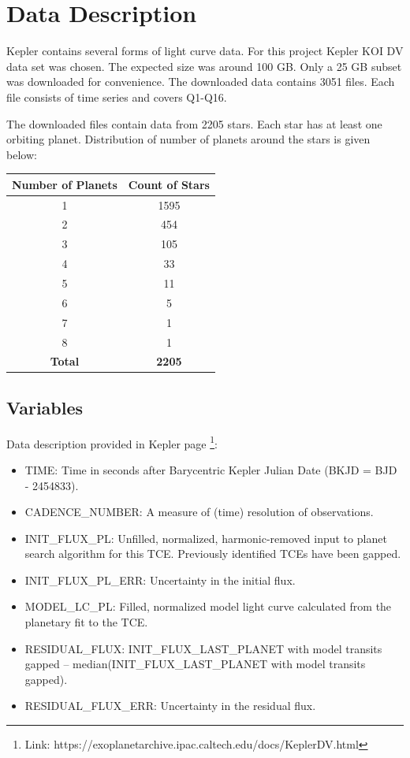 \documentclass[%
aip,
amsmath,amssymb,
reprint,%
]{revtex4-1}
\begin{document}
\section{Data Description}

Kepler contains several forms of light curve data. For this project Kepler KOI DV data set was chosen. The expected size was around 100 GB. Only a 25 GB subset was downloaded for convenience. The downloaded data contains 3051 files. Each file consists of time series and covers Q1-Q16.

The downloaded files contain data from 2205 stars. Each star has at least one orbiting planet. Distribution of number of planets around the stars is given below:

\begin{center}
 \begin{tabular}{| c | c |} 
 \hline
 \textbf{Number of Planets} & \textbf{Count of Stars}\\ [0.5 ex]
 \hline
 1 & 1595 \\ 
 \hline
 2 & 454 \\
 \hline
 3 & 105 \\
 \hline
 4 & 33 \\
 \hline
 5 & 11 \\
 \hline
 6 & 5 \\
 \hline
 7 & 1 \\
 \hline
 8 & 1 \\
 \hline
 \textbf{Total} & \textbf{2205} \\ [1ex] 
 \hline
\end{tabular}
\end{center}


\subsection{Variables}

Data description provided in Kepler page \footnote{Link: https://exoplanetarchive.ipac.caltech.edu/docs/KeplerDV.html}:

\begin{itemize}
  \item TIME: Time in seconds after Barycentric Kepler Julian Date (BKJD = BJD - 2454833).
  \item CADENCE\_NUMBER: A measure of (time) resolution of observations.
  \item INIT\_FLUX\_PL: Unfilled, normalized, harmonic-removed input to planet search algorithm for this TCE. Previously identified TCEs have been gapped.
  \item INIT\_FLUX\_PL\_ERR: Uncertainty in the initial flux.
  \item MODEL\_LC\_PL: Filled, normalized model light curve calculated from the planetary fit to the TCE.
  \item RESIDUAL\_FLUX: INIT\_FLUX\_LAST\_PLANET with model transits gapped – median(INIT\_FLUX\_LAST\_PLANET with model transits gapped).
  \item RESIDUAL\_FLUX\_ERR: Uncertainty in the residual flux.
\end{itemize}
\end{document}
